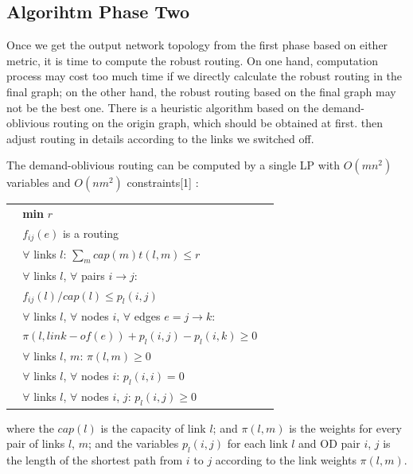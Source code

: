 \documentclass[conference]{IEEEtran}
\begin{document}
\subsection{Algorihtm Phase Two}
Once we get the output network topology from the first phase based on either metric, it is time to compute
the robust routing. On one hand, computation process may cost too much time if we directly calculate the robust routing in 
the final graph; on the other hand, the robust routing based on the final graph may not be the best one.
There is a heuristic algorithm
based on the demand-oblivious routing on the origin graph, which should be obtained at first.
then adjust routing in details according to the links we switched off.


The demand-oblivious routing can be computed by a single LP with $O(mn^2)$ variables and $O(nm^2)$ constraints[1] :
\begin{table}[!th]
\begin{tabular}{ll}
$\:\:$\quad\quad\quad\quad\ \textbf{min} $r$ \\
$\:\:$\quad\quad\quad\quad\ $f_{ij}(e)$ is a routing \\
$\:\:$\quad\quad\quad\quad\ $\forall$ links $l$: $\sum_m cap(m)t(l,m) \le r$ \\
$\:\:$\quad\quad\quad\quad\ $\forall$ links $l$, $\forall$ pairs $i \rightarrow j$: \\
$\:\:$\quad\quad\quad\quad\quad\quad\ $f_{ij}(l)/cap(l) \le p_l(i,j)$ \\ 
$\:\:$\quad\quad\quad\quad\ $\forall$ links $l$, $\forall$ nodes $i$, $\forall$ edges $e = j \rightarrow k$: \\
$\:\:$\quad\quad\quad\quad\quad\quad\ $\pi(l, link-of(e)) + p_l(i,j) - p_l(i,k) \ge 0$ \\
$\:\:$\quad\quad\quad\quad\ $\forall$ links $l$, $m$: $\pi(l, m) \ge 0$ \\
$\:\:$\quad\quad\quad\quad\ $\forall$ links $l$, $\forall$ nodes $i$: $p_l(i,i) = 0$ \\
$\:\:$\quad\quad\quad\quad\ $\forall$ links $l$, $\forall$ nodes $i$, $j$: $p_l(i,j) \ge 0$ \\
\end{tabular}
\end{table}


where the $cap(l)$ is the capacity of link $l$; 
and $\pi(l,m)$ is the weights for every pair of links $l$, $m$; and the variables $p_l(i,j)$ for each link $l$ 
and OD pair $i$, $j$ is the length of the shortest path from $i$ to $j$ according to the link weights $\pi(l, m)$.
\end{document}
